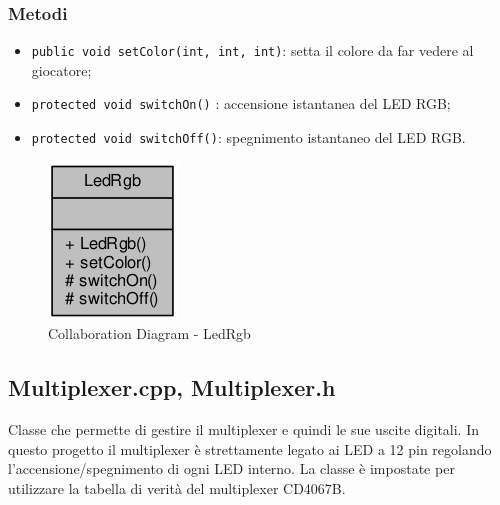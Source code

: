 \subsubsection{Metodi}
\begin{itemize}
	\item \texttt{public void setColor(int, int, int)}: setta il colore da far vedere al giocatore;
	\item \texttt{protected	void switchOn()} : accensione istantanea del LED RGB;
	\item \texttt{protected	void switchOff()}: spegnimento istantaneo del LED RGB.
\end{itemize}
\begin{figure}[!ht]
	\centering
	\includegraphics[scale=.5]{img/UML/CollaborationDiagram/LedRgb.png}
	\caption{Collaboration Diagram - LedRgb}
\end{figure}

\newpage
\subsection{Multiplexer.cpp, Multiplexer.h}
Classe che permette di gestire il multiplexer e quindi le sue uscite digitali. In questo progetto il multiplexer è strettamente legato ai LED a 12 pin regolando l'accensione/spegnimento di ogni LED interno. La classe è impostate per utilizzare la tabella di verità del multiplexer CD4067B.
